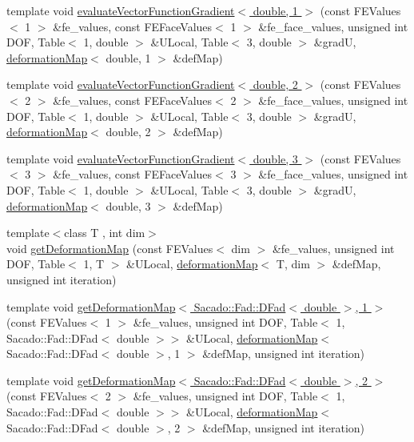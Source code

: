\begin{DoxyCompactItemize}
\item 
template void \hyperlink{function_evaluations_8cc_a20af37a91c353a81f4d9ad3b2dd678af}{evaluate\-Vector\-Function\-Gradient$<$ double, 1 $>$} (const F\-E\-Values$<$ 1 $>$ \&fe\-\_\-values, const F\-E\-Face\-Values$<$ 1 $>$ \&fe\-\_\-face\-\_\-values, unsigned int D\-O\-F, Table$<$ 1, double $>$ \&U\-Local, Table$<$ 3, double $>$ \&grad\-U, \hyperlink{structdeformation_map}{deformation\-Map}$<$ double, 1 $>$ \&def\-Map)
\item 
template void \hyperlink{function_evaluations_8cc_a60c8d8f11fc75f1a2d1775dd5ea95d79}{evaluate\-Vector\-Function\-Gradient$<$ double, 2 $>$} (const F\-E\-Values$<$ 2 $>$ \&fe\-\_\-values, const F\-E\-Face\-Values$<$ 2 $>$ \&fe\-\_\-face\-\_\-values, unsigned int D\-O\-F, Table$<$ 1, double $>$ \&U\-Local, Table$<$ 3, double $>$ \&grad\-U, \hyperlink{structdeformation_map}{deformation\-Map}$<$ double, 2 $>$ \&def\-Map)
\item 
template void \hyperlink{function_evaluations_8cc_a9aaa007fb989c138e170beb650e31c31}{evaluate\-Vector\-Function\-Gradient$<$ double, 3 $>$} (const F\-E\-Values$<$ 3 $>$ \&fe\-\_\-values, const F\-E\-Face\-Values$<$ 3 $>$ \&fe\-\_\-face\-\_\-values, unsigned int D\-O\-F, Table$<$ 1, double $>$ \&U\-Local, Table$<$ 3, double $>$ \&grad\-U, \hyperlink{structdeformation_map}{deformation\-Map}$<$ double, 3 $>$ \&def\-Map)
\item 
{\footnotesize template$<$class T , int dim$>$ }\\void \hyperlink{group___evaluation_functions_ga62b026b5bcee0bda21159ff6782b4b59}{get\-Deformation\-Map} (const F\-E\-Values$<$ dim $>$ \&fe\-\_\-values, unsigned int D\-O\-F, Table$<$ 1, T $>$ \&U\-Local, \hyperlink{structdeformation_map}{deformation\-Map}$<$ T, dim $>$ \&def\-Map, unsigned int iteration)
\item 
template void \hyperlink{function_evaluations_8cc_a03a34b508ad64e47d31b1b36a05f4e7b}{get\-Deformation\-Map$<$ Sacado\-::\-Fad\-::\-D\-Fad$<$ double $>$, 1 $>$} (const F\-E\-Values$<$ 1 $>$ \&fe\-\_\-values, unsigned int D\-O\-F, Table$<$ 1, Sacado\-::\-Fad\-::\-D\-Fad$<$ double $>$$>$ \&U\-Local, \hyperlink{structdeformation_map}{deformation\-Map}$<$ Sacado\-::\-Fad\-::\-D\-Fad$<$ double $>$, 1 $>$ \&def\-Map, unsigned int iteration)
\item 
template void \hyperlink{function_evaluations_8cc_a024d1c1e0bf1b0c62eb8e8eba210e04f}{get\-Deformation\-Map$<$ Sacado\-::\-Fad\-::\-D\-Fad$<$ double $>$, 2 $>$} (const F\-E\-Values$<$ 2 $>$ \&fe\-\_\-values, unsigned int D\-O\-F, Table$<$ 1, Sacado\-::\-Fad\-::\-D\-Fad$<$ double $>$$>$ \&U\-Local, \hyperlink{structdeformation_map}{deformation\-Map}$<$ Sacado\-::\-Fad\-::\-D\-Fad$<$ double $>$, 2 $>$ \&def\-Map, unsigned int iteration)

\end{DoxyCompactItemize}
